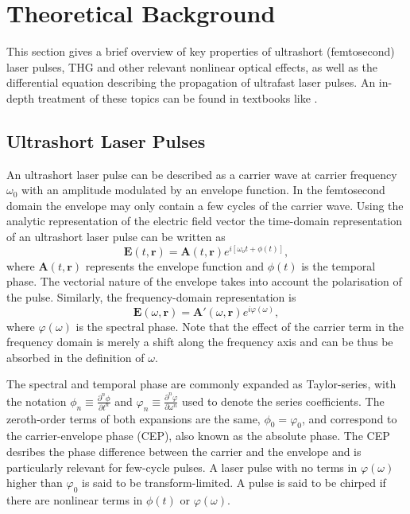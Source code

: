 \documentclass[a4paper]{jpconf}
\begin{document}
\section{Theoretical Background}
This section gives a brief overview of key properties of ultrashort (femtosecond) laser pulses,  THG and other relevant nonlinear optical effects, as well as the differential equation describing the propagation of ultrafast laser pulses. An in-depth treatment of these topics can be found in textbooks like \cite{keller2021, new2011}. 

\subsection{Ultrashort Laser Pulses}
An ultrashort laser pulse can be described as a carrier wave at carrier frequency $\omega_0$ with an amplitude modulated by an envelope function. In the femtosecond domain the envelope may only contain a few cycles of the carrier wave. Using the analytic representation of the electric field vector the time-domain representation of an ultrashort laser pulse can be written as 
\begin{equation}
\mathbf{E}(t, \mathbf{r}) = \mathbf{A}(t, \mathbf{r}) e^{i[ \omega_o t + \phi(t)]},
\end{equation}
where $\mathbf{A}(t, \mathbf{r})$ represents the envelope function and $\phi(t)$ is the temporal phase. The vectorial nature of the envelope takes into account the polarisation of the pulse. Similarly, the frequency-domain representation is 
\begin{equation}
\mathbf{E}(\omega, \mathbf{r}) = \mathbf{A}'(\omega, \mathbf{r}) e^{i \varphi(\omega)},
\end{equation}
where $\varphi(\omega)$ is the spectral phase. Note that the effect of the carrier term in the frequency domain is merely a shift along the frequency axis and can be thus be absorbed in the definition of $\omega$. \par 
The spectral and temporal phase are commonly expanded as Taylor-series, with the notation $\phi_n \equiv \frac{\partial^n \phi}{\partial t^n}$ and $\varphi_n \equiv \frac{\partial^n \varphi}{\partial \omega^n}$ used to denote the series coefficients. The zeroth-order terms of both expansions are the same, $\phi_0 = \varphi_0$, and correspond to the carrier-envelope phase (CEP), also known as the absolute phase. The CEP desribes the phase difference between the carrier and the envelope and is particularly relevant for few-cycle pulses. A laser pulse with no terms in $\varphi(\omega)$ higher than $\varphi_0$ is said to be transform-limited. A pulse is said to be chirped if there are nonlinear terms in $\phi(t)$ or $\varphi(\omega)$. \par 
\end{document}
